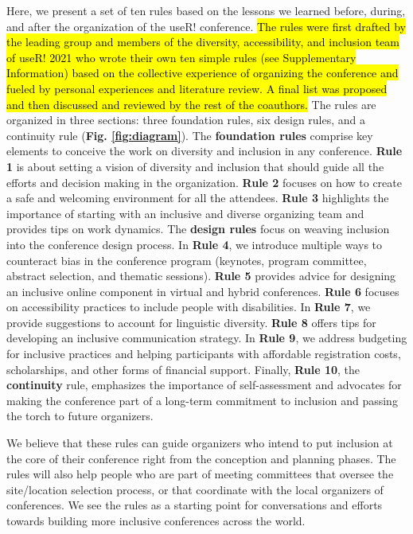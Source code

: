 \documentclass[10pt,letterpaper]{article}
\begin{document}
Here, we present a set of ten rules based on the lessons we learned before, during, and after the organization of the useR! conference.
 \hl{The rules were first drafted by the leading group and  members of the diversity, accessibility, and inclusion team of useR! 2021 who wrote their own ten simple rules (see Supplementary Information) based on the collective experience of organizing the conference and fueled by personal experiences and literature review.
A final list was proposed and then discussed and reviewed by the rest of the coauthors.} 
The rules are organized in three sections: three foundation rules, six design rules, and a continuity rule (\textbf{Fig. \ref{fig:diagram}}).
The \textbf{foundation rules} comprise key elements to conceive the work on diversity and inclusion in any conference. 
\textbf{Rule 1} is about setting a vision of diversity and inclusion that should guide all the efforts and decision making in the organization.
\textbf{Rule 2} focuses on how to create a safe and welcoming environment for all the attendees. 
\textbf{Rule 3} highlights the importance of starting with an inclusive and diverse organizing team and provides tips on work dynamics.
The \textbf{design rules} focus on weaving inclusion into the conference design process.
In \textbf{Rule 4}, we introduce multiple ways to counteract bias in the conference program (keynotes, program committee, abstract selection, and thematic sessions). 
\textbf{Rule 5} provides advice for designing an inclusive online component in virtual and hybrid conferences.
\textbf{Rule 6} focuses on accessibility practices to include people with disabilities.
In \textbf{Rule 7}, we provide suggestions to account for linguistic diversity. 
\textbf{Rule 8} offers tips for developing an inclusive communication strategy. 
In \textbf{Rule 9}, we address budgeting for inclusive practices and helping participants with affordable registration costs, scholarships, and other forms of financial support.
Finally, 
\textbf{Rule 10}, the \textbf{continuity} rule, emphasizes the importance of self-assessment and advocates for making the conference part of a long-term commitment to inclusion and passing the torch to future organizers. 

We believe that these rules can guide organizers who intend to put inclusion at the core of their conference right from the conception and planning phases.
The rules will also help people who are part of meeting committees that oversee the site/location selection process, or that coordinate with the local organizers of conferences. 
We see the rules as a starting point for conversations and efforts towards building more inclusive conferences across the world.
\end{document}
